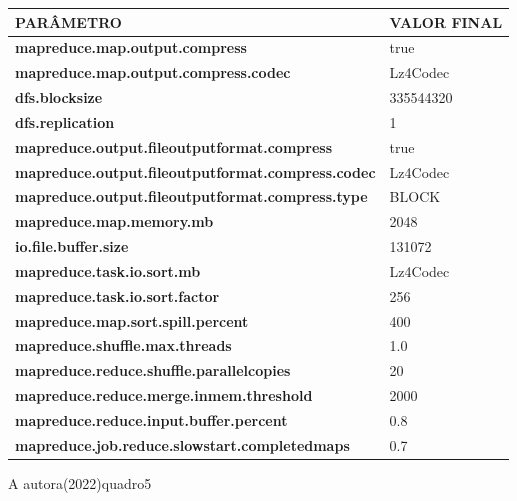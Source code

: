 {\footnotesize
  \centering
  \begin{tabular}{|p{80mm}|p{25mm}|}\hline
    \textbf{PARÂMETRO}                                        & \textbf{VALOR FINAL} \\\hline
    \textbf{mapreduce.map.output.compress}                    & true                 \\\hline
    \textbf{mapreduce.map.output.compress.codec}              & Lz4Codec             \\\hline
    \textbf{dfs.blocksize}                                    & 335544320            \\\hline
    \textbf{dfs.replication}                                  & 1                    \\\hline
    \textbf{mapreduce.output.fileoutputformat.compress}       & true                 \\\hline
    \textbf{mapreduce.output.fileoutputformat.compress.codec} & Lz4Codec             \\\hline
    \textbf{mapreduce.output.fileoutputformat.compress.type}  & BLOCK                \\\hline
    \textbf{mapreduce.map.memory.mb}                          & 2048                 \\\hline
    \textbf{io.file.buffer.size}                              & 131072               \\\hline
    \textbf{mapreduce.task.io.sort.mb}                        & Lz4Codec             \\\hline
    \textbf{mapreduce.task.io.sort.factor}                    & 256                  \\\hline
    \textbf{mapreduce.map.sort.spill.percent}                 & 400                  \\\hline
    \textbf{mapreduce.shuffle.max.threads}                    & 1.0                  \\\hline
    \textbf{mapreduce.reduce.shuffle.parallelcopies}          & 20                   \\\hline
    \textbf{mapreduce.reduce.merge.inmem.threshold}           & 2000                 \\\hline
    \textbf{mapreduce.reduce.input.buffer.percent}            & 0.8                  \\\hline
    \textbf{mapreduce.job.reduce.slowstart.completedmaps}     & 0.7                  \\\hline
  \end{tabular}}
{A autora(2022)}{quadro5}{}{}

